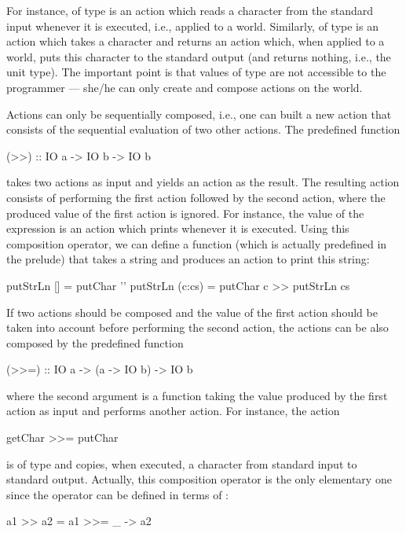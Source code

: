For instance, 
of type  is an action
which reads a character from the standard input whenever it is executed,
i.e., applied to a world. Similarly, 
of type  is an action which takes a character
and returns an action which, when
applied to a world, puts this character to the standard output
(and returns nothing, i.e., the unit type).
The important point is that values of type  are
not accessible to the programmer --- she/he can only create
and compose actions on the world.

Actions can only be sequentially composed, i.e., one can built a new
action that consists of the sequential evaluation of two
other actions. The predefined function \pindex{>>}
\begin{curry}
(>>) :: IO a -> IO b -> IO b
\end{curry}
takes two actions as input and yields an action as the result.
The resulting action consists of performing the first action followed
by the second action, where the produced value of the first action is
ignored. For instance, the value of the expression
 is an action which prints
 whenever it is executed. Using this composition operator,
we can define a function 
(which is actually predefined in the prelude)
that takes a string and produces an action to print this string:
\begin{curry}
putStrLn []     = putChar '\n'
putStrLn (c:cs) = putChar c >> putStrLn cs
\end{curry}
If two actions should be composed and the
value of the first action should be taken into account
before performing the second action, the actions can be also composed by
the predefined function\pindex{>>=}
\begin{curry}
(>>=) :: IO a -> (a -> IO b) -> IO b
\end{curry}
where the second argument is a function taking the value produced
by the first action as input and performs another action.
For instance, the action
\begin{curry}
getChar >>= putChar
\end{curry}
is of type  and copies, when executed, a character
from standard input to standard output.
Actually, this composition operator is the only elementary one
since the operator \ccode{>>} can be defined in terms of \ccode{>>=}:
\begin{curry}
a1 >> a2  =  a1 >>= \_ -> a2
\end{curry}
